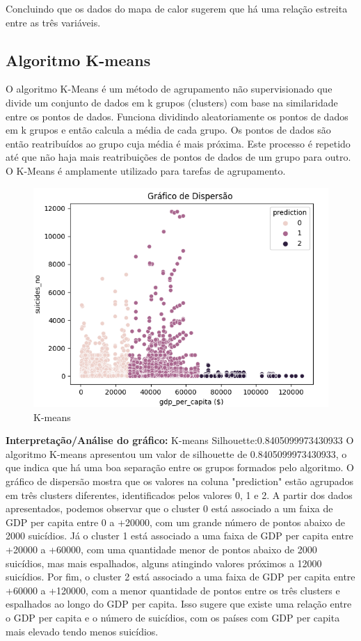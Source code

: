 \documentclass{article}
\begin{document}
Concluindo que os dados do mapa de calor sugerem que há uma relação estreita entre as três variáveis.
\newpage

\subsection{Algoritmo K-means}

O algoritmo K-Means é um método de agrupamento não supervisionado que divide um conjunto de dados em k grupos (clusters) com base na similaridade entre os pontos de dados. Funciona dividindo aleatoriamente os pontos de dados em k grupos e então calcula a média de cada grupo. Os pontos de dados são então reatribuídos ao grupo cuja média é mais próxima. Este processo é repetido até que não haja mais reatribuições de pontos de dados de um grupo para outro. O K-Means é amplamente utilizado para tarefas de agrupamento.
\bigskip

\begin{figure}[ht]
    \centering
   \includegraphics[scale=0.8]{grafioDK.png}
    \caption{K-means}
   \label{fig:km}
\end{figure}

 \textbf{Interpretação/Análise do gráfico:}
K-means Silhouette:0.8405099973430933
 \newline
O algoritmo K-means apresentou um valor de silhouette de 0.8405099973430933, o que indica que há uma boa separação entre os grupos formados pelo algoritmo. O gráfico de dispersão mostra que os valores na coluna "prediction" estão agrupados em três clusters diferentes, identificados pelos valores 0, 1 e 2. A partir dos dados apresentados, podemos observar que o cluster 0 está associado a um faixa de GDP per capita entre 0 a +20000, com um grande número de pontos abaixo de 2000 suicídios. Já o cluster 1 está associado a uma faixa de GDP per capita entre +20000 a +60000, com uma quantidade menor de pontos abaixo de 2000 suicídios, mas mais espalhados, alguns atingindo valores próximos a 12000 suicídios. Por fim, o cluster 2 está associado a uma faixa de GDP per capita entre +60000 a +120000, com a menor quantidade de pontos entre os três clusters e espalhados ao longo do GDP per capita. Isso sugere que existe uma relação entre o GDP per capita e o número de suicídios, com os países com GDP per capita mais elevado tendo menos suicídios.
\newpage
\end{document}
